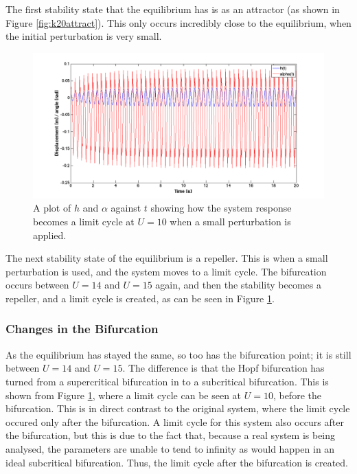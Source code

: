 \noindent The first stability state that the equilibrium has is as an attractor (as shown in Figure \ref{fig:k20attract}). This only occurs incredibly close to the equilibrium, when the initial perturbation is very small. 

\begin{figure}[H]
\centering
\includegraphics[width=1.0\textwidth]{k20repel.png}
\caption{\label{fig:k20repel} A plot of $h$ and $\alpha$ against $t$ showing how the system response becomes a limit cycle at $U=10$ when a small perturbation is applied.  }
\end{figure}

\noindent The next stability state of the equilibrium is a repeller. This is when a small perturbation is used, and the system moves to a limit cycle. The bifurcation occurs between $U=14$ and $U = 15$ again, and then the stability becomes a repeller, and a limit cycle is created, as can be seen in Figure \ref{fig:k20repel}.

\subsubsection{Changes in the Bifurcation}

As the equilibrium has stayed the same, so too has the bifurcation point; it is still between $U = 14$ and $U = 15$. The difference is that the Hopf bifurcation has turned from a supercritical bifurcation in to a subcritical bifurcation. This is shown from Figure \ref{fig:k20repel}, where a limit cycle can be seen at $U = 10$, before the bifurcation. This is in direct contrast to the original system, where the limit cycle occured only after the bifurcation. A limit cycle for this system also occurs after the bifurcation, but this is due to the fact that, because a real system is being analysed, the parameters are unable to tend to infinity as would happen in an ideal subcritical bifurcation. Thus, the limit cycle after the bifurcation is created. 


